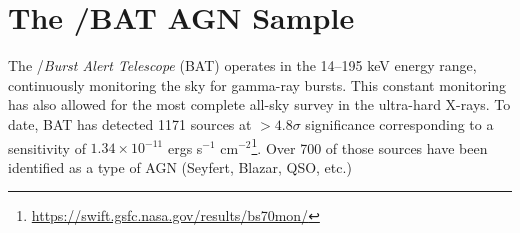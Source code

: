 \section{The \swift/BAT AGN Sample}\label{sample}
The  \swift/\textit{Burst Alert Telescope} (BAT) \citep{Barthelmy:2005ul,Gehrels:2004qf} operates in the 14--195 keV energy range, continuously monitoring the sky for gamma-ray bursts. This constant monitoring has also allowed for the most complete all-sky survey in the ultra-hard X-rays. To date, BAT has detected 1171 sources at  $>4.8\sigma$ significance corresponding to a sensitivity of $1.34\times10^{-11}$ ergs s$^{-1}$ cm$^{-2}$\footnote{\url{https://swift.gsfc.nasa.gov/results/bs70mon/}}. Over 700 of those sources have been identified as a type of AGN (Seyfert, Blazar, QSO, etc.)
